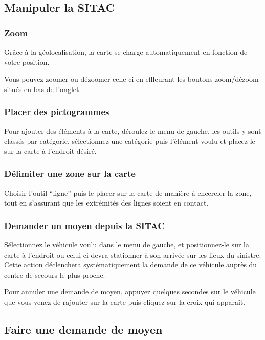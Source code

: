 \documentclass{article}
\begin{document}
\subsection{Manipuler la SITAC}


\subsubsection{Zoom}

Grâce à la géolocalisation, la carte se charge automatiquement 
en fonction de votre position.

Vous pouvez zoomer ou dézoomer celle-ci en effleurant les boutons 
zoom/dézoom situés en bas de l'onglet.


\subsubsection{Placer des pictogrammes}

Pour ajouter des éléments à la carte, déroulez le menu de 
gauche, les outils y sont classés par catégorie, sélectionnez une catégorie 
puis l'élément voulu et placez-le sur la carte à l'endroit désiré.


\subsubsection{Délimiter une zone sur la carte}

Choisir l'outil ``ligne'' puis le placer sur la carte de manière 
à encercler la zone, tout en s'assurant que les extrémités des lignes soient 
en contact.


\subsubsection{Demander un moyen depuis la SITAC}

Sélectionnez le véhicule voulu dans le menu de gauche, et positionnez-le 
sur la carte à l'endroit ou celui-ci devra stationner à son arrivée sur les 
lieux du sinistre. Cette action déclenchera systématiquement la demande de ce 
véhicule auprès du centre de secours le plus proche.

Pour annuler une demande de moyen, appuyez quelques secondes sur 
le véhicule que vous venez de rajouter sur la carte puis cliquez sur la croix 
qui apparaît.


\subsection{Faire une demande de moyen}
\end{document}
